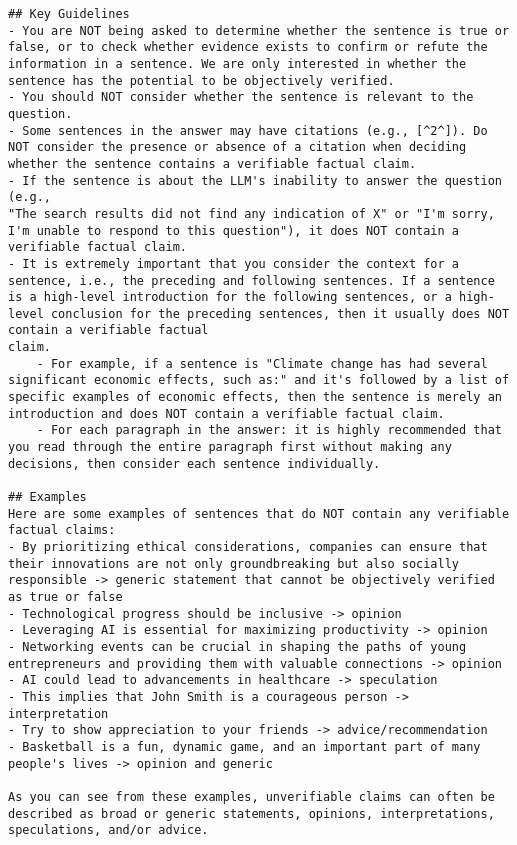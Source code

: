 \begin{tcolorbox}
\begin{lstlisting}[breaklines=true, breakindent=0pt, basicstyle=\small\ttfamily\raggedright, xleftmargin=-5pt, frame=none, xrightmargin=-5pt, aboveskip=-2pt, belowskip=-2pt]
## Key Guidelines
- You are NOT being asked to determine whether the sentence is true or false, or to check whether evidence exists to confirm or refute the information in a sentence. We are only interested in whether the sentence has the potential to be objectively verified. 
- You should NOT consider whether the sentence is relevant to the question.
- Some sentences in the answer may have citations (e.g., [^2^]). Do NOT consider the presence or absence of a citation when deciding whether the sentence contains a verifiable factual claim.
- If the sentence is about the LLM's inability to answer the question (e.g., 
"The search results did not find any indication of X" or "I'm sorry, I'm unable to respond to this question"), it does NOT contain a verifiable factual claim.
- It is extremely important that you consider the context for a sentence, i.e., the preceding and following sentences. If a sentence is a high-level introduction for the following sentences, or a high-level conclusion for the preceding sentences, then it usually does NOT contain a verifiable factual 
claim.	
    - For example, if a sentence is "Climate change has had several significant economic effects, such as:" and it's followed by a list of specific examples of economic effects, then the sentence is merely an introduction and does NOT contain a verifiable factual claim.
    - For each paragraph in the answer: it is highly recommended that you read through the entire paragraph first without making any decisions, then consider each sentence individually.

## Examples
Here are some examples of sentences that do NOT contain any verifiable factual claims: 
- By prioritizing ethical considerations, companies can ensure that their innovations are not only groundbreaking but also socially responsible -> generic statement that cannot be objectively verified as true or false
- Technological progress should be inclusive -> opinion
- Leveraging AI is essential for maximizing productivity -> opinion
- Networking events can be crucial in shaping the paths of young entrepreneurs and providing them with valuable connections -> opinion
- AI could lead to advancements in healthcare -> speculation
- This implies that John Smith is a courageous person -> interpretation
- Try to show appreciation to your friends -> advice/recommendation
- Basketball is a fun, dynamic game, and an important part of many people's lives -> opinion and generic

As you can see from these examples, unverifiable claims can often be described as broad or generic statements, opinions, interpretations, speculations, and/or advice.


\end{lstlisting}
\end{tcolorbox}
